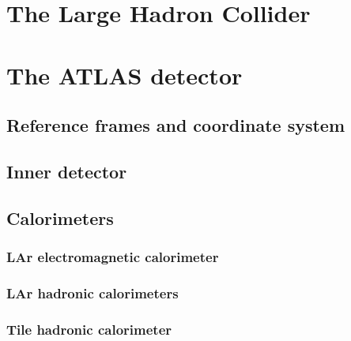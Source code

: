 \documentclass[11pt,twoside]{book}
\begin{document}
\section{The Large Hadron Collider}
\label{sec:LHC}

\section{The ATLAS detector}
\label{sec:ATLAS}

\subsection{Reference frames and coordinate system}
\label{sec:coordinates}

\subsection{Inner detector}
\label{sec:ID}

\subsection{Calorimeters}
\label{sec:calo}
\subsubsection{LAr electromagnetic calorimeter}
\label{sec:elelar}
\subsubsection{LAr hadronic calorimeters}
\label{sec:elehad}
\subsubsection{Tile hadronic calorimeter}
\label{sec:tilecal}
\end{document}
